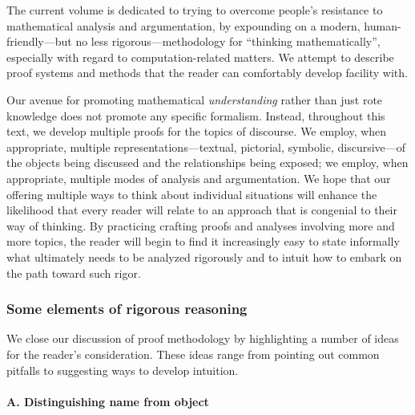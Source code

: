 The current volume is dedicated to trying to overcome people's resistance to mathematical analysis and argumentation, by expounding on a modern, human-friendly---but no less rigorous---methodology for ``thinking mathematically'', especially with regard to computation-related matters.  We attempt to describe proof systems and methods that the reader can
comfortably develop facility with.

\smallskip

Our avenue for promoting mathematical {\em understanding} rather than just rote knowledge does not promote any specific formalism.  Instead, throughout this text, we develop multiple proofs for the topics of discourse.  We employ, when appropriate, multiple representations---textual, pictorial, symbolic, discursive---of the objects being discussed and the relationships being exposed; we employ, when appropriate, multiple modes of analysis and argumentation.  We hope that our offering multiple ways to think about individual situations will enhance the likelihood that every reader will relate to an approach that is congenial to their way of thinking.  By practicing crafting 
proofs and analyses involving more and more topics, the reader will begin to find it increasingly easy to state informally what ultimately needs to be analyzed rigorously and to intuit how to embark on the path toward such rigor.

\subsubsection{Some elements of rigorous reasoning}
\label{sec:elements-of-reasoning}

We close our discussion of proof methodology by highlighting a number of ideas for the reader's consideration.  These ideas range from pointing out common pitfalls to suggesting ways to develop intuition.

\paragraph{A. Distinguishing name from object}

